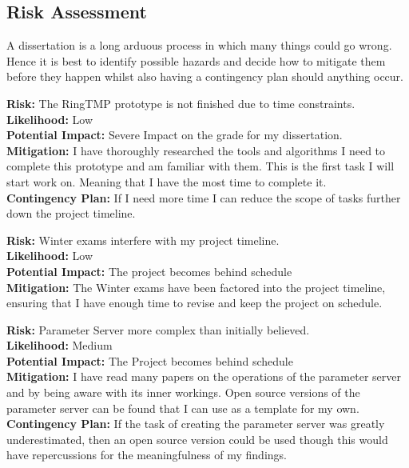 \clearpage

\subsection{Risk Assessment}

A dissertation is a long arduous process in which many things could go wrong.
Hence it is best to identify possible hazards and decide how to mitigate them
before they happen whilst also having a contingency plan should anything occur. \par

\noindent \textbf{Risk:} The RingTMP prototype is not finished due to time constraints.\\
\textbf{Likelihood:} Low\\
\textbf{Potential Impact:} Severe Impact on the grade for my dissertation.\\
\textbf{Mitigation:} I have thoroughly researched the tools and algorithms I need to
complete this prototype and am familiar with them. This is the first task I will
start work on. Meaning that I have the most time to complete it.\\
\textbf{Contingency Plan:} If I need more time I can reduce the scope of tasks further
down the project timeline. \par

\noindent \textbf{Risk:} Winter exams interfere with my project timeline.\\
\textbf{Likelihood:} Low\\
\textbf{Potential Impact:} The project becomes behind schedule\\
\textbf{Mitigation:} The Winter exams have been factored into the project timeline,
ensuring that I have enough time to revise and keep the project on schedule.\par

\noindent \textbf{Risk:} Parameter Server more complex than initially believed.\\
\textbf{Likelihood:} Medium\\
\textbf{Potential Impact:} The Project becomes behind schedule\\
\textbf{Mitigation:} I have read many papers on the operations of the parameter server
and by being aware with its inner workings. Open source versions of the
parameter server can be found that I can use as a template for my own.\\
\textbf{Contingency Plan:} If the task of creating the parameter server was greatly
underestimated, then an open source version could be used though this would have
repercussions for the meaningfulness of my findings.\par

